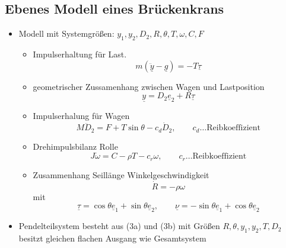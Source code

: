 \documentclass[ngerman]{tudscrreprt}
\begin{document}
\subsection{Ebenes Modell eines Brückenkrans}
\begin{itemize}
\item Modell mit Systemgrößen: $y_1,y_2, D_2, R, \theta, T, \omega, C,F$ 
\begin{itemize}
\item Impulserhaltung für Last. 
\begin{equation*}
m(\underline{\ddot{y}} - \underline{g}) = -T\underline{\tau} \tag{3a}
\end{equation*}
\item geometrischer Zussamenhang zwischen Wagen und Lastposition 
\begin{equation*}
\underline y = D_2 \underline{e}_2 + R\underline{\tau} \tag{3b}
\end{equation*}
\item Impulserhalung für Wagen
\begin{equation*}
M\ddot{D}_2 = F + T\sin{\theta} - c_d \dot{D}_2, \qquad c_d \dots\text{Reibkoeffizient} \tag{3c}
\end{equation*}
\item Drehimpulsbilanz Rolle
\begin{equation*}
J\dot{\omega} = C - \rho T - c_r \omega,\qquad c_r\dots\text{Reibkoeffizient}\tag{3d}
\end{equation*}
\item Zusammenhang Seillänge Winkelgeschwindigkeit 
\begin{equation*}
\dot R = -\rho \omega \tag{3e}
\end{equation*}
mit 
\begin{equation*}
\underline{\tau} = \cos{\theta}\underline{e}_1 + \sin{\theta}\underline{e}_2,\qquad \underline{\nu} = -\sin{\theta}\underline{e}_1 + \cos{\theta}\underline{e}_2 \tag{4}
\end{equation*}
\end{itemize}
\item Pendelteilsystem besteht aus (3a) und (3b) mit Größen $R,\theta, y_1,y_2,T,D_2$ besitzt gleichen flachen Ausgang wie Gesamtsystem
\end{itemize}
\end{document}
